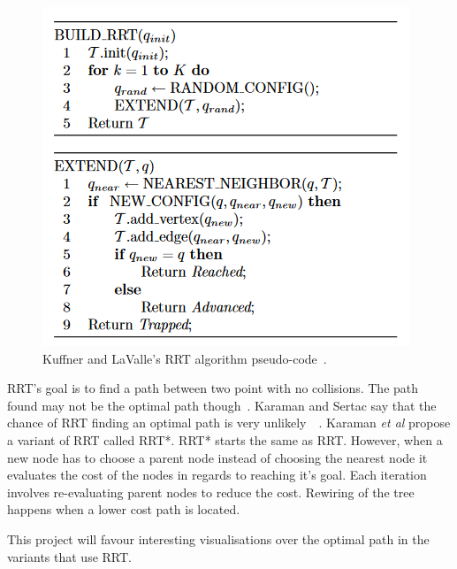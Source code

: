 \documentclass[journal]{IEEEtran}
\begin{document}
\begin{figure}[h]
	\includegraphics[width=1.0\linewidth]{RRTPseudocode.png}
	\caption{ Kuffner and LaValle's RRT algorithm pseudo-code~\cite{Kuffner2000}.}
	\label{RRTPseudocode}
\end{figure} 

RRT's goal is to find a path between two point with no collisions. The path found may not be the optimal path though~\cite{Kuffner2000, Karaman2011}. Karaman and Sertac say that the chance of RRT finding an optimal path is very unlikely~\cite{karaman2010}~\cite{Tremblay2014}.  Karaman \textit{et al} propose a variant of RRT called RRT*. RRT* starts the same as RRT. However, when a new node has to choose a parent node instead of choosing the  nearest node it evaluates the cost of the nodes in regards to reaching it's goal. Each iteration involves re-evaluating parent nodes to reduce the cost. Rewiring of the tree happens when a lower cost path is located.


This project will favour interesting visualisations over the optimal path in the variants that use RRT. 
\end{document}
